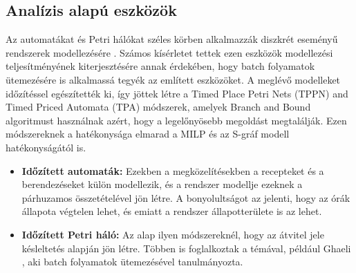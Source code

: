 \subsection{Analízis alapú eszközök}
Az automatákat és Petri hálókat széles körben alkalmazzák diszkrét eseményű rendszerek modellezésére \cite{cassandras}. Számos kísérletet tettek ezen eszközök modellezési teljesítményének kiterjesztésére annak érdekében, hogy batch folyamatok ütemezésére is alkalmassá tegyék az említett eszközöket. A meglévő modelleket időzítéssel egészítették ki, így jöttek létre a Timed Place Petri Nets (TPPN) and Timed Priced Automata (TPA) módszerek, amelyek Branch and Bound algoritmust használnak azért, hogy a legelőnyösebb megoldást megtalálják. Ezen módszereknek a hatékonysága elmarad a MILP és az S-gráf modell hatékonyságától is.
\begin{itemize}
	\item[] \textbf{Időzített automaták:} Ezekben a megközelítésekben a recepteket és a berendezéseket külön modellezik, és a rendszer modellje ezeknek a párhuzamos összetételével jön létre. A bonyolultságot az jelenti, hogy az órák állapota végtelen lehet, és emiatt a rendszer állapotterülete is az lehet.
	\item[] \textbf{Időzített Petri háló:} Az alap ilyen módszereknél, hogy az átvitel jele késleltetés alapján jön létre. Többen is foglalkoztak a témával, például Ghaeli \cite{ghaeli}, aki batch folyamatok ütemezésével tanulmányozta.
\end{itemize}

